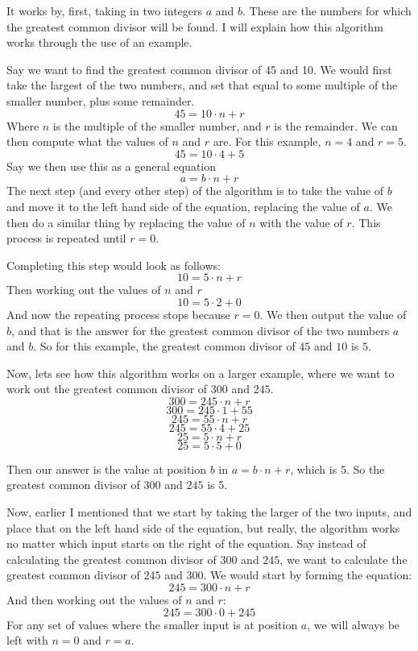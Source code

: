 \documentclass[12pt]{article}
\begin{document}
It works by, first, taking in two integers $a$ and $b$. These are the numbers for which the greatest common divisor will be found. I will explain how this algorithm works through the use of an example.

Say we want to find the greatest common divisor of 45 and 10.
We would first take the largest of the two numbers, and set that equal to some multiple of the smaller number, plus some remainder.
$$45 = 10 \cdot n + r$$
Where $n$ is the multiple of the smaller number, and $r$ is the remainder.
We can then compute what the values of $n$ and $r$ are. For this example, $n = 4$ and $r = 5$.
$$45 = 10 \cdot 4 + 5$$
Say we then use this as a general equation
$$a = b \cdot n + r$$
The next step (and every other step) of the algorithm is to take the value of $b$ and move it to the left hand side of the equation, replacing the value of $a$. We then do a similar thing by replacing the value of $n$ with the value of $r$. This process is repeated until $r = 0$.

Completing this step would look as follows:
$$10 = 5 \cdot n + r$$
Then working out the values of $n$ and $r$
$$10 = 5 \cdot 2 + 0$$
And now the repeating process stops because $r=0$. We then output the value of $b$, and that is the answer for the greatest common divisor of the two numbers $a$ and $b$. So for this example, the greatest common divisor of $45$ and $10$ is $5$.

Now, lets see how this algorithm works on a larger example, where we want to work out the greatest common divisor of $300$ and $245$.
$$300 = 245 \cdot n + r$$
$$300 = 245 \cdot 1 + 55$$
$$245 = 55 \cdot n + r$$
$$245 = 55 \cdot 4 + 25$$
$$25 = 5 \cdot n + r$$
$$25 = 5 \cdot 5 + 0$$

Then our answer is the value at position $b$ in $a = b \cdot n + r$, which is $5$. So the greatest common divisor of $300$ and $245$ is 5.

Now, earlier I mentioned that we start by taking the larger of the two inputs, and place that on the left hand side of the equation, but really, the algorithm works no matter which input starts on the right of the equation. Say instead of calculating the greatest common divisor of $300$ and $245$, we want to calculate the greatest common divisor of $245$ and $300$. We would start by forming the equation:
$$245 = 300 \cdot n + r$$
And then working out the values of $n$ and $r$:
$$245 = 300 \cdot 0 + 245$$
For any set of values where the smaller input is at position $a$, we will always be left with $n = 0$ and $r = a$.
\end{document}
